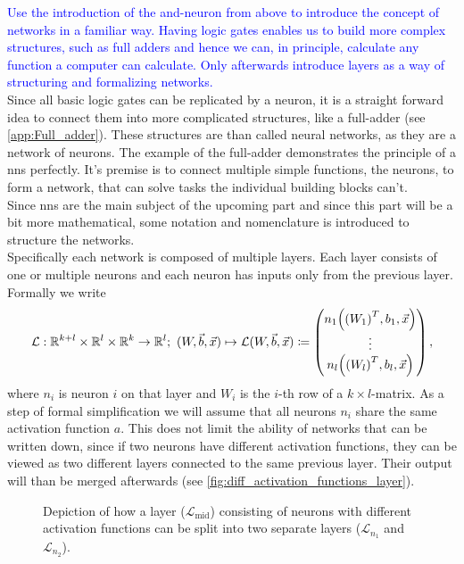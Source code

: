 \medskip
\textcolor{blue}{Use the introduction of the and-neuron from above to introduce the concept of networks in a familiar way. Having logic gates enables us to build more complex structures, such as full adders and hence we can, in principle, calculate any function a computer can calculate. Only afterwards introduce layers as a way of structuring and formalizing networks.}\\
\noindent Since all basic logic gates can be replicated by a neuron, it is a straight forward idea to connect them into more complicated structures, like a full-adder (see \autoref{app:Full_adder}). These structures are than called neural networks, as they are a network of neurons. The example of the full-adder demonstrates the principle of a \gls{nns} perfectly. It's premise is to connect multiple simple functions, the neurons, to form a network, that can solve tasks the individual building blocks can't.\medskip\\
Since \gls{nns} are the main subject of the upcoming part and since this part will be a bit more mathematical, some notation and nomenclature is introduced to structure the networks.\\
Specifically each network is composed of multiple layers. Each layer consists of one or multiple neurons and each neuron has inputs only from the previous layer.  Formally we write
\begin{equation}
\mathcal{L}:\R^{k+l}\times\R^l\times\R^k\to\R^l;\ (W, \vec{b}, \vec{x})\mapsto\mathcal{L}(W,\vec{b},\vec{x})\coloneqq
\begin{pmatrix}
n_1\lr{{(W_1)}^T,b_1,\vec{x}}\\
\vdots\\
n_l\lr{{(W_l)}^T,b_l,\vec{x}}
\end{pmatrix},
\end{equation}
where $n_i$ is neuron $i$ on that layer and $W_i$ is the $i$-th row of a $k\times l$-matrix. As a step of formal simplification we will assume that all neurons $n_i$ share the same activation function $a$. This does not limit the ability of networks that can be written down, since if two neurons have different activation functions, they can be viewed as two different layers connected to the same previous layer. Their output will than be merged afterwards (see \autoref{fig:diff_activation_functions_layer}).\\
\begin{figure}
\centering

\caption{Depiction of how a layer ($\mathcal{L}_\text{mid}$) consisting of neurons with different activation functions can be split into two separate layers ($\mathcal{L}_{n_1}$ and $\mathcal{L}_{n_2}$).}\label{fig:diff_activation_functions_layer}
\end{figure}

